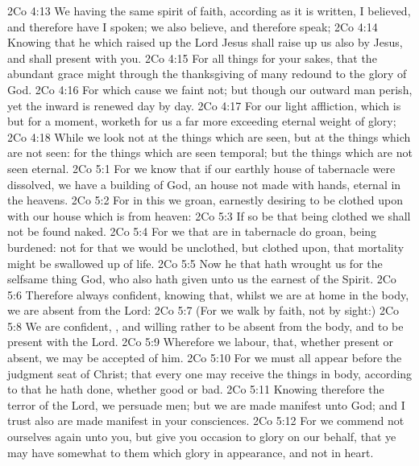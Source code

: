 \vs 2Co 4:13 We having the same spirit of faith, according as it is written, I believed, and therefore have I spoken; we also believe, and therefore speak;
\vs 2Co 4:14 Knowing that he which raised up the Lord Jesus shall raise up us also by Jesus, and shall present  with you.
\vs 2Co 4:15 For all things  for your sakes, that the abundant grace might through the thanksgiving of many redound to the glory of God.
\vs 2Co 4:16 For which cause we faint not; but though our outward man perish, yet the inward  is renewed day by day.
\vs 2Co 4:17 For our light affliction, which is but for a moment, worketh for us a far more exceeding  eternal weight of glory;
\vs 2Co 4:18 While we look not at the things which are seen, but at the things which are not seen: for the things which are seen  temporal; but the things which are not seen  eternal.
\vs 2Co 5:1 For we know that if our earthly house of  tabernacle were dissolved, we have a building of God, an house not made with hands, eternal in the heavens.
\vs 2Co 5:2 For in this we groan, earnestly desiring to be clothed upon with our house which is from heaven:
\vs 2Co 5:3 If so be that being clothed we shall not be found naked.
\vs 2Co 5:4 For we that are in  tabernacle do groan, being burdened: not for that we would be unclothed, but clothed upon, that mortality might be swallowed up of life.
\vs 2Co 5:5 Now he that hath wrought us for the selfsame thing  God, who also hath given unto us the earnest of the Spirit.
\vs 2Co 5:6 Therefore  always confident, knowing that, whilst we are at home in the body, we are absent from the Lord:
\vs 2Co 5:7 (For we walk by faith, not by sight:)
\vs 2Co 5:8 We are confident, , and willing rather to be absent from the body, and to be present with the Lord.
\vs 2Co 5:9 Wherefore we labour, that, whether present or absent, we may be accepted of him.
\vs 2Co 5:10 For we must all appear before the judgment seat of Christ; that every one may receive the things  in  body, according to that he hath done, whether  good or bad.
\vs 2Co 5:11 Knowing therefore the terror of the Lord, we persuade men; but we are made manifest unto God; and I trust also are made manifest in your consciences.
\vs 2Co 5:12 For we commend not ourselves again unto you, but give you occasion to glory on our behalf, that ye may have somewhat to  them which glory in appearance, and not in heart.
